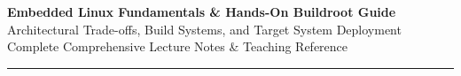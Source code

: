 \documentclass[11pt,a4paper]{article}
\begin{document}
\begin{center}
    \begin{tcolorbox}[width=\textwidth,halign=center,valign=center,top=6mm,bottom=6mm]
        {\huge \color{white} \bfseries Embedded Linux Fundamentals \& Hands-On Buildroot Guide}\\[3mm]
        {\large \color{white} Architectural Trade-offs, Build Systems, and Target System Deployment}\\[2mm]
        {\small \color{white} Complete Comprehensive Lecture Notes \& Teaching Reference}
    \end{tcolorbox}
\end{center}

\vspace{2mm}
\tableofcontents
\vspace{4mm}
\hrule
\vspace{6mm}







\end{document}
